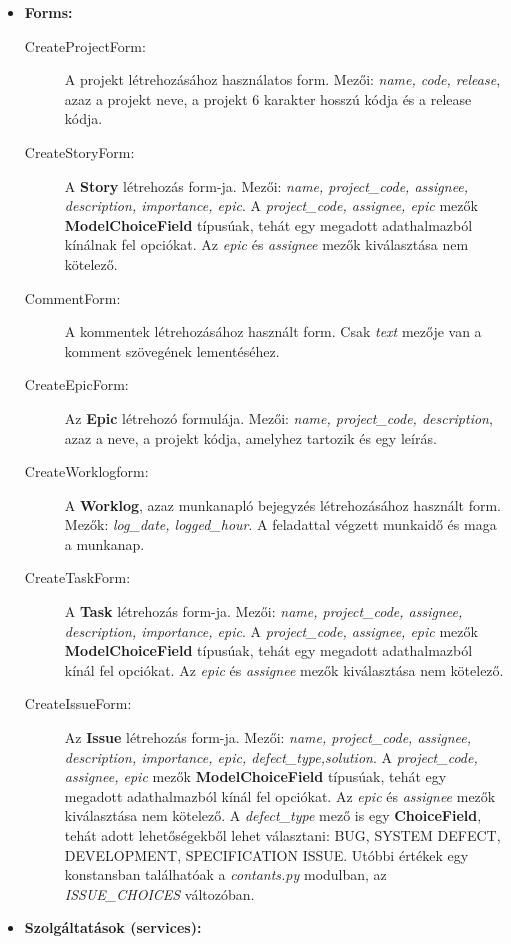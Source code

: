 \begin{itemize}
	\item \textbf{Forms:}
	\begin{description}
		\item[CreateProjectForm:] A projekt létrehozásához használatos form. Mezői: \textit{name, code, release}, azaz a projekt neve, a projekt 6 karakter hosszú kódja és a release kódja.
		\item[CreateStoryForm:] A \textbf{Story} létrehozás form-ja. Mezői: \textit{name, project\_code, assignee, description, importance, epic}. A \textit{project\_code, assignee, epic} mezők \textbf{ModelChoiceField} típusúak, tehát egy megadott adathalmazból kínálnak fel opciókat. Az \textit{epic} és \textit{assignee} mezők kiválasztása nem kötelező.
		\item[CommentForm:] A kommentek létrehozásához használt form. Csak \textit{text} mezője van a komment szövegének lementéséhez.
		\item[CreateEpicForm:] Az \textbf{Epic} létrehozó formulája. Mezői: \textit{name, project\_code, description}, azaz a neve, a projekt kódja, amelyhez tartozik és egy leírás.
		\item[CreateWorklogform:] A \textbf{Worklog}, azaz munkanapló bejegyzés létrehozásához használt form. Mezők: \textit{log\_date, logged\_hour}. A feladattal végzett munkaidő és maga a munkanap.
		\item[CreateTaskForm:]  A \textbf{Task} létrehozás form-ja. Mezői: \textit{name, project\_code, assignee, description, importance, epic}. A \textit{project\_code, assignee, epic} mezők \textbf{ModelChoiceField} típusúak, tehát egy megadott adathalmazból kínál fel opciókat. Az \textit{epic} és \textit{assignee} mezők kiválasztása nem kötelező.
		\item[CreateIssueForm:] Az \textbf{Issue} létrehozás form-ja. Mezői: \textit{name, project\_code, assignee, description, importance, epic, defect\_type,solution}. A \textit{project\_code, assignee, epic} mezők \textbf{ModelChoiceField} típusúak, tehát egy megadott adathalmazból kínál fel opciókat. Az \textit{epic} és \textit{assignee} mezők kiválasztása nem kötelező. A \textit{defect\_type} mező is egy \textbf{ChoiceField}, tehát adott lehetőségekből lehet választani: BUG, SYSTEM DEFECT, DEVELOPMENT, SPECIFICATION ISSUE. Utóbbi értékek egy konstansban találhatóak a \textit{contants.py} modulban, az \textit{ISSUE\_CHOICES} változóban.
	\end{description}
	\item \textbf{Szolgáltatások (services):}

\end{itemize}
